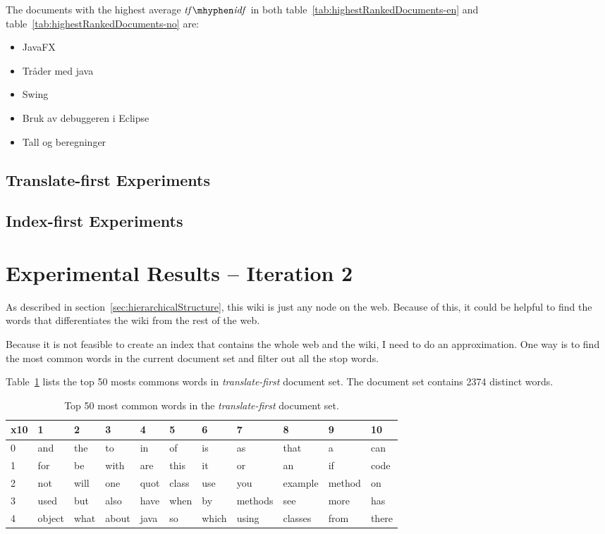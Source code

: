 \documentclass[a4paper]{book}
\newcommand\tfidf{\mathit{tf\mhyphen idf}}
\begin{document}
The documents with the highest average $\tfidf$ in both table~\ref{tab:highestRankedDocuments-en} and table~\ref{tab:highestRankedDocuments-no} are:
\begin{itemize}
\item JavaFX
\item Tråder med java
\item Swing
\item Bruk av debuggeren i Eclipse
\item Tall og beregninger
\end{itemize}

\subsection{Translate-first Experiments}
\label{subsec:experiments-en}



\subsection{Index-first Experiments}
\label{subsec:experiments-no}



\section{Experimental Results -- Iteration 2}
\label{sec:experimentalResults-2}

As described in section~\ref{sec:hierarchicalStructure}, this wiki is just any node on the web. Because of this, it could be helpful to find the words that differentiates the wiki from the rest of the web.

Because it is not feasible to create an index that contains the whole web and the wiki, I need to do an approximation. One way is to find the most common words in the current document set and filter out all the stop words.

Table~\ref{tab:top50words-en} lists the top 50 mosts commons words in \textit{translate-first} document set. The document set contains 2374 distinct words.
\begin{table}[H]
\centering
\begin{tabular}{|l|l l l l l l l l l l|}
\hline\hline
    x10 & 1 & 2 & 3 & 4 & 5 & 6 & 7 & 8 & 9 & 10 \\
\hline
    0 & and & the & to & in & of & is & as & that & a & can \\
\hline
    1 & for & be & with & are & this & it & or & an & if & code \\
\hline
    2 & not & will & one & quot & class & use & you & example & method & on \\
\hline
    3 & used & but & also & have & when & by & methods & see & more & has \\
\hline
    4 & object & what & about & java & so & which & using & classes & from & there \\
\hline\hline
\end{tabular}
\caption{Top 50 most common words in the \textit{translate-first} document set.}
\label{tab:top50words-en}
\end{table}
\end{document}
